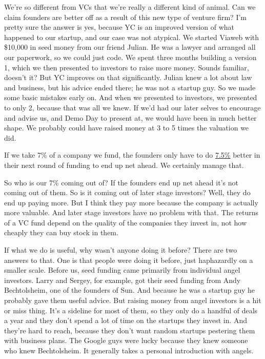 We're so different from VCs that we're really a different kind of
animal. Can we claim founders are better off as a result of this new
type of venture firm? I'm pretty sure the answer is yes, because YC is
an improved version of what happened to our startup, and our case was
not atypical. We started Viaweb with \$10,000 in seed money from our
friend Julian. He was a lawyer and arranged all our paperwork, so we
could just code. We spent three months building a version 1, which we
then presented to investors to raise more money. Sounds familiar,
doesn't it? But YC improves on that significantly. Julian knew a lot
about law and business, but his advice ended there; he was not a startup
guy. So we made some basic mistakes early on. And when we presented to
investors, we presented to only 2, because that was all we knew. If we'd
had our later selves to encourage and advise us, and Demo Day to present
at, we would have been in much better shape. We probably could have
raised money at 3 to 5 times the valuation we did.

If we take 7\% of a company we fund, the founders only have to do
\href{equity.html}{7.5\%} better in their next round of funding to end
up net ahead. We certainly manage that.

So who is our 7\% coming out of? If the founders end up net ahead it's
not coming out of them. So is it coming out of later stage investors?
Well, they do end up paying more. But I think they pay more because the
company is actually more valuable. And later stage investors have no
problem with that. The returns of a VC fund depend on the quality of the
companies they invest in, not how cheaply they can buy stock in them.

If what we do is useful, why wasn't anyone doing it before? There are
two answers to that. One is that people were doing it before, just
haphazardly on a smaller scale. Before us, seed funding came primarily
from individual angel investors. Larry and Sergey, for example, got
their seed funding from Andy Bechtolsheim, one of the founders of Sun.
And because he was a startup guy he probably gave them useful advice.
But raising money from angel investors is a hit or miss thing. It's a
sideline for most of them, so they only do a handful of deals a year and
they don't spend a lot of time on the startups they invest in. And
they're hard to reach, because they don't want random startups pestering
them with business plans. The Google guys were lucky because they knew
someone who knew Bechtolsheim. It generally takes a personal
introduction with angels.

